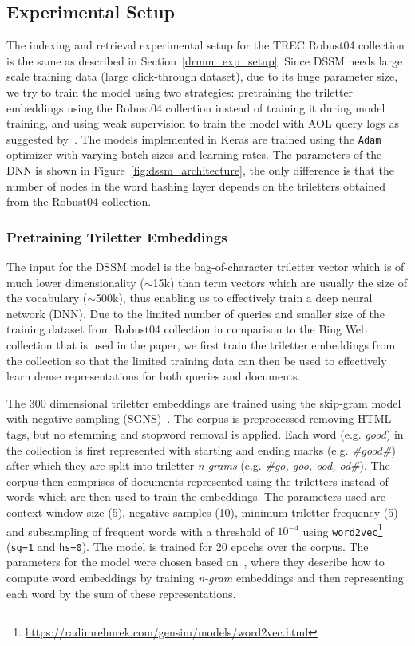 \subsection{Experimental Setup}
The indexing and retrieval experimental setup for the TREC Robust04 collection is the same as described in Section~\ref{drmm_exp_setup}. Since DSSM needs large scale training data (large click-through dataset), due to its huge parameter size, we try to train the model using two strategies: pretraining the triletter embeddings using the Robust04 collection instead of training it during model training, and using weak supervision to train the model with AOL query logs as suggested by~\cite{Dehghani_sigir17}. The models implemented in Keras are trained using the \texttt{Adam} optimizer with varying batch sizes and learning rates. The parameters of the DNN is shown in Figure~\ref{fig:dssm_architecture}, the only difference is that the number of nodes in the word hashing layer depends on the triletters obtained from the Robust04 collection.

\subsubsection{Pretraining Triletter Embeddings}

The input for the DSSM model is the bag-of-character triletter vector which is of much lower dimensionality ($\sim$15k) than term vectors which are usually the size of the vocabulary ($\sim$500k), thus enabling us to effectively train a deep neural network (DNN). Due to the limited number of queries and smaller size of the training dataset from Robust04 collection in comparison to the Bing Web collection that is used in the paper, we first train the triletter embeddings from the collection so that the limited training data can then be used to effectively learn dense representations for both queries and documents.

The 300 dimensional triletter embeddings are trained using the skip-gram model with negative sampling (SGNS)~\citep{Mikolov2013}. The corpus is preprocessed removing HTML tags, but no stemming and stopword removal is applied. Each word (e.g. \textit{good}) in the collection is first represented with starting and ending marks (e.g. \textit{\#good\#}) after which they are split into triletter \textit{n-grams} (e.g. \textit{\#go, goo, ood, od\#}). The corpus then comprises of documents represented using the triletters instead of words which are then used to train the embeddings. The parameters used are context window size (5), negative samples (10), minimum triletter frequency (5) and subsampling of frequent words with a threshold of $10^{-4}$ using \texttt{word2vec}\footnote{\url{https://radimrehurek.com/gensim/models/word2vec.html}} (\texttt{sg=1} and \texttt{hs=0}). The model is trained for 20 epochs over the corpus. The parameters for the model were chosen based on~\cite{ngram_embeddings17}, where they describe how to compute word embeddings by training \textit{n-gram} embeddings and then representing each word by the sum of these representations.


